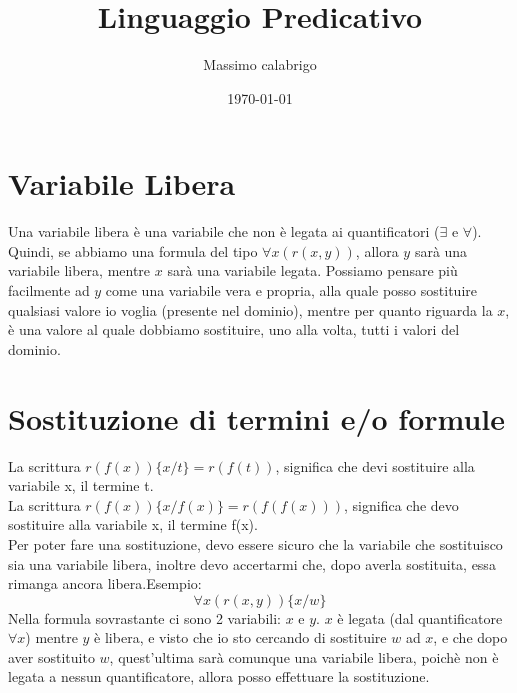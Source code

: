 \documentclass[11pt]{article}
\begin{document}
\title{Linguaggio Predicativo}
\author{Massimo calabrigo}
\date{\today}
\maketitle

\tableofcontents

\section{Variabile Libera}
Una variabile libera è una variabile che non è legata ai quantificatori ($\exists$ e $\forall$).\\
Quindi, se abbiamo una formula del tipo $\forall x(r(x, y))$, allora $y$ sarà una variabile libera, mentre $x$ sarà una variabile legata.
Possiamo pensare più facilmente ad $y$ come una variabile vera e propria, alla quale posso sostituire qualsiasi valore io voglia (presente nel dominio), mentre
per quanto riguarda la $x$, è una valore al quale dobbiamo sostituire, uno alla volta, tutti i valori del dominio.
\section{Sostituzione di termini e/o formule}
La scrittura $r(f(x)) \{x/t\} = r(f(t))$, significa che devi sostituire alla variabile x, il termine t.\\
La scrittura $r(f(x)) \{x/f(x)\} = r(f(f(x)))$, significa che devo sostituire alla variabile x, il termine f(x).\\
Per poter fare una sostituzione, devo essere sicuro che la variabile che sostituisco sia una variabile libera, 
inoltre devo accertarmi che, dopo averla sostituita, essa rimanga ancora libera.Esempio:
$$\forall x(r(x,y)) \{x/w\}$$
Nella formula sovrastante ci sono 2 variabili: $x$ e $y$. $x$ è legata (dal quantificatore $\forall x$) mentre $y$ è libera, e visto 
che io sto cercando di sostituire $w$ ad $x$, e che dopo aver sostituito $w$, quest'ultima sarà comunque una variabile libera, poichè 
non è legata a nessun quantificatore, allora posso effettuare la sostituzione.
\end{document}
